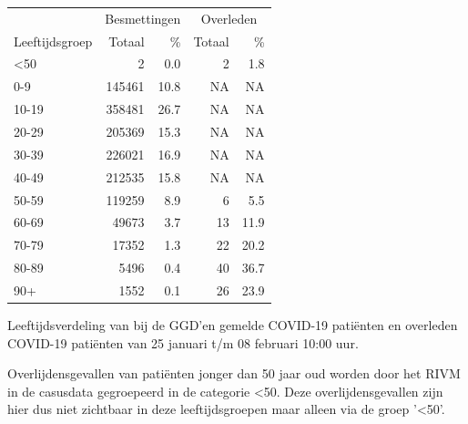 \documentclass[
  english,
  man,floatsintext]{apa6}
\begin{document}
\begin{table}
\centering\begingroup\fontsize{11}{13}\selectfont

\begin{threeparttable}
\begin{tabular}{lrrrr}
\toprule
\multicolumn{1}{c}{ } & \multicolumn{2}{c}{Besmettingen} & \multicolumn{2}{c}{Overleden} \\
\cmidrule(l{3pt}r{3pt}){2-3} \cmidrule(l{3pt}r{3pt}){4-5}
Leeftijdsgroep & Totaal & \% & Totaal & \%\\
\midrule
<50 & 2 & 0.0 & 2 & 1.8\\
0-9 & 145461 & 10.8 & NA & NA\\
10-19 & 358481 & 26.7 & NA & NA\\
20-29 & 205369 & 15.3 & NA & NA\\
30-39 & 226021 & 16.9 & NA & NA\\
40-49 & 212535 & 15.8 & NA & NA\\
50-59 & 119259 & 8.9 & 6 & 5.5\\
60-69 & 49673 & 3.7 & 13 & 11.9\\
70-79 & 17352 & 1.3 & 22 & 20.2\\
80-89 & 5496 & 0.4 & 40 & 36.7\\
90+ & 1552 & 0.1 & 26 & 23.9\\
\bottomrule
\end{tabular}
\begin{tablenotes}
\item[1] Leeftijdsverdeling van bij de GGD’en gemelde COVID-19 patiënten en overleden COVID-19 patiënten van 25 januari t/m 08 februari 10:00 uur.
\item[2] Overlijdensgevallen van patiënten jonger dan 50 jaar oud worden door het RIVM in de casusdata gegroepeerd in de categorie <50. Deze overlijdensgevallen zijn hier dus niet zichtbaar in deze leeftijdsgroepen maar alleen via de groep '<50'.
\end{tablenotes}
\end{threeparttable}
\endgroup{}
\end{table}

\newpage
\end{document}

